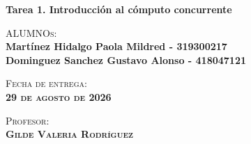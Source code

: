 \begin{titlepage}
\begin{minipage}[c][0.81\textheight][t]{0.75\textwidth}
\begin{center}
            \textbf{\Large Tarea 1. Introducción al cómputo concurrente} \\

            \vspace{1cm}
            
            \textsc{\Large{ALUMNOs:}}\\[0.3cm]
            \textbf{Martínez Hidalgo Paola Mildred - 319300217} \\
            \textbf{Dominguez Sanchez Gustavo Alonso - 418047121} \\
            [0.2cm]
                \vspace{1cm}
            
            \textsc{{Fecha de entrega: \\ \textbf{29 de agosto de 2026}}}\\[0.5cm]        
            \vspace{0.5cm}
            
            \textsc{{Profesor: \\ \textbf{Gilde Valeria Rodríguez}}}\\[0.5cm]  
            
            
            \vspace{0.5cm}
        \end{center}
    \end{minipage}
\end{titlepage}